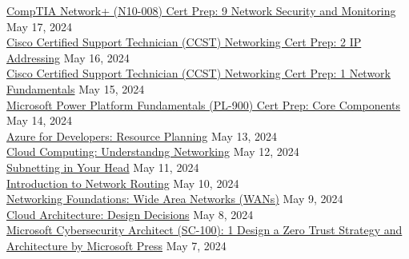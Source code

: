 \documentclass[10pt]{res} %
\begin{document}
\begin{resume}
\href{https://www.linkedin.com/learning/certificates/602ec19580760cae815be01fb2590f49680fdb699a3639b6c8551c93699d6586}{\color{blue}CompTIA Network+ (N10-008) Cert Prep: 9 Network Security and Monitoring} \hfill May 17, 2024 \\
\href{https://www.linkedin.com/learning/certificates/5c802eb583cf5aa66b5ecc4bbe202f88833050f69cba266b7368b8a84716e631}{\color{blue}Cisco Certified Support Technician (CCST) Networking Cert Prep: 2 IP Addressing} \hfill May 16, 2024 \\
\href{https://www.linkedin.com/learning/certificates/b6d1c43aadb775ed514ffdb63ebcb83cb5c0a7f0319ea3c842159afa816b213f}{\color{blue}Cisco Certified Support Technician (CCST) Networking Cert Prep: 1 Network Fundamentals} \hfill May 15, 2024 \\
\href{https://www.linkedin.com/learning/certificates/0b062e3a627a590c502abfc60bb8b3c3346c3650443973a68e7b08226fcc5881}{\color{blue}Microsoft Power Platform Fundamentals (PL-900) Cert Prep: Core Components} \hfill May 14, 2024 \\
\href{https://www.linkedin.com/learning/certificates/889f51646977a4b059faf80ada56a30cd84c564072dc1aeabe1fbe9f00723717}{\color{blue}Azure for Developers: Resource Planning} \hfill May 13, 2024 \\
\href{https://www.linkedin.com/learning/certificates/5f1164ec3c040ffe7e9f8b66a6f362a410702a0fd208c13f79be03e75dfc6fee}{\color{blue}Cloud Computing: Understandng Networking} \hfill May 12, 2024 \\
\href{https://www.linkedin.com/learning/certificates/bff260243d37b6b455de68bf6e3cf4e0b24843d0bad6c3199e5aad4d4f36cf39}{\color{blue}Subnetting in Your Head} \hfill May 11, 2024 \\
\href{https://www.linkedin.com/learning/certificates/a10fbb7fb1babd8ebeab604137668fc1f27ae0aae22efb8c830ff94ee976ae0a}{\color{blue}Introduction to Network Routing} \hfill May 10, 2024 \\
\href{https://www.linkedin.com/learning/certificates/c6a95ebbc978792f6aa7dfbda03c5530ab8ff0c6a9b2d6599b5a68520f4a02d0}{\color{blue}Networking Foundations: Wide Area Networks (WANs)} \hfill May 9, 2024 \\
\href{https://www.linkedin.com/learning/certificates/678b0f60f79c17ff79fabac6f134b1ad638e126780467846427d3f65ef2cfa32}{\color{blue}Cloud Architecture: Design Decisions} \hfill May 8, 2024 \\
\href{https://www.linkedin.com/learning/certificates/92387801ac023df742332179e5aeb69aa3dcfaac5e76026f0bd5e80485fb6dee}{\color{blue}Microsoft Cybersecurity Architect (SC-100): 1 Design a Zero Trust Strategy and Architecture by Microsoft Press} \hfill May 7, 2024 \\

\end{resume}
\end{document}
